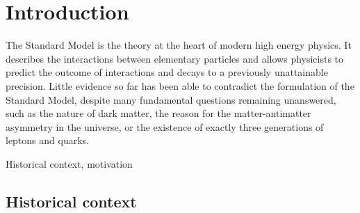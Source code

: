 \chapter{Introduction}

The Standard Model is the theory at the heart of modern high energy physics. It describes the interactions between elementary particles and allows physicists to predict the outcome of interactions and decays to a previously unattainable precision. Little evidence so far has been able to contradict the formulation of the Standard Model, despite many fundamental questions remaining unanswered, such as the nature of dark matter, the reason for the matter-antimatter asymmetry in the universe, or the existence of exactly three generations of leptons and quarks.

Historical context, motivation

\section{Historical context}

%
%
%
%
